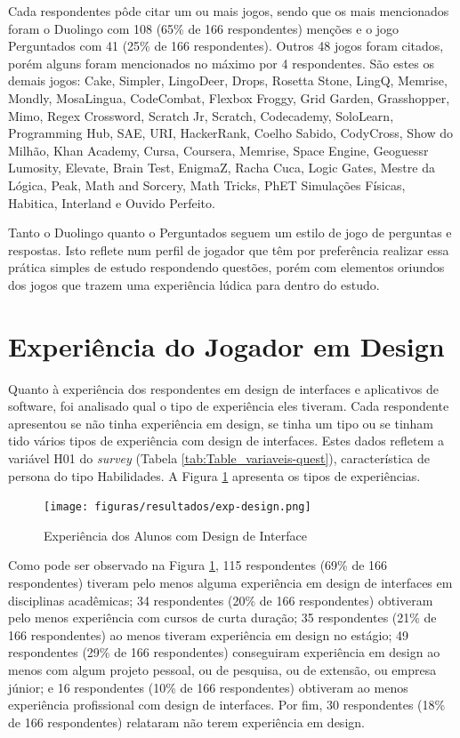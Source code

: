 Cada respondentes pôde citar um ou mais jogos, sendo que os mais mencionados foram o Duolingo com 108 (65\% de 166 respondentes) menções e o jogo Perguntados com 41 (25\% de 166 respondentes). Outros 48 jogos foram citados, porém alguns foram mencionados no máximo por 4 respondentes. São estes os demais jogos: Cake, Simpler, LingoDeer, Drops, Rosetta Stone, LingQ, Memrise, Mondly, MosaLingua, CodeCombat, Flexbox Froggy, Grid Garden, Grasshopper, Mimo, Regex Crossword, Scratch Jr, Scratch, Codecademy, SoloLearn, Programming Hub, SAE, URI, HackerRank, Coelho Sabido, CodyCross, Show do Milhão, Khan Academy, Cursa, Coursera, Memrise, Space Engine, Geoguessr
Lumosity, Elevate, Brain Test, EnigmaZ, Racha Cuca, Logic Gates, Mestre da Lógica, Peak, Math and Sorcery, Math Tricks, PhET Simulações Físicas, Habitica, Interland e Ouvido Perfeito.

Tanto o Duolingo quanto o Perguntados seguem um estilo de jogo de perguntas e respostas. Isto reflete num perfil de jogador que têm por preferência realizar essa prática simples de estudo respondendo questões, porém com elementos oriundos dos jogos que trazem uma experiência lúdica para dentro do estudo.

\section{Experiência do Jogador em Design}
\label{sec:exp-design}

Quanto à experiência dos respondentes em design de interfaces e aplicativos de software, foi analisado qual o tipo de experiência eles tiveram. Cada respondente apresentou se não tinha experiência em design, se tinha um tipo ou se tinham tido vários tipos de experiência com design de interfaces. Estes dados refletem a variável H01 do \textit{survey} (Tabela \ref{tab:Table_variaveis-quest}), característica de persona do tipo Habilidades. A Figura \ref{Fig:exp-design.png} apresenta os tipos de experiências.  

\newpage

\begin{figure}[htbp]
	\centering
	\caption{Experiência dos Alunos com Design de Interface}
	\texttt{[image: figuras/resultados/exp-design.png]}
	\label{Fig:exp-design.png}
\end{figure}

Como pode ser observado na Figura \ref{Fig:exp-design.png}, 115 respondentes (69\% de 166 respondentes) tiveram pelo menos alguma experiência em design de interfaces em disciplinas acadêmicas; 34 respondentes (20\% de 166 respondentes) obtiveram pelo menos experiência com cursos de curta duração; 35 respondentes (21\% de 166 respondentes) ao menos tiveram experiência em design no estágio; 49 respondentes (29\% de 166 respondentes) conseguiram experiência em design ao menos com algum projeto pessoal, ou de pesquisa, ou de extensão, ou empresa júnior; e 16 respondentes (10\% de 166 respondentes) obtiveram ao menos experiência profissional com design de interfaces. Por fim, 30 respondentes (18\% de 166 respondentes) relataram não terem experiência em design.

